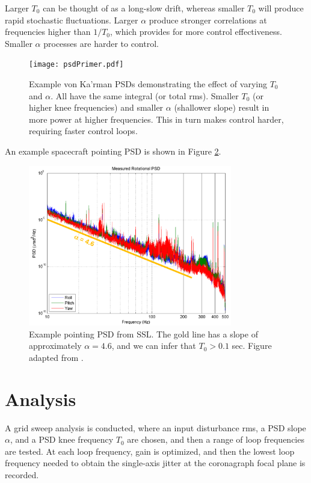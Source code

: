\documentclass[10pt,preprint]{aastex631}
\begin{document}
Larger $T_0$ can be thought of as a long-slow drift, whereas smaller $T_0$ will produce rapid stochastic fluctuations.  Larger $\alpha$ produce stronger correlations at frequencies higher than $1/T_0$, which provides for more control effectiveness.  Smaller $\alpha$ processes are harder to control.

\begin{figure}
\centering
\texttt{[image: psdPrimer.pdf]}
\caption{Example von Ka'rman PSDs demonstrating the effect of varying $T_0$ and $\alpha$.  All have the same integral (or total rms). Smaller $T_0$ (or higher knee frequencies) and smaller $\alpha$ (shallower slope) result in more power at higher frequencies.  This in turn makes control harder, requiring faster control loops. \label{fig:vkpsds}}
\end{figure}

An example spacecraft pointing PSD is shown in Figure \ref{fig:examp_psd}.

\begin{figure}
\centering
\includegraphics[width=3.5in]{ssl_example.png}
\caption{Example pointing PSD from SSL.  The gold line has a slope of approximately $\alpha=4.6$, and we can infer that $T_0 > 0.1$ sec.  Figure adapted from \citet{woo:2017}. \label{fig:examp_psd}}
\end{figure}

\section{Analysis}

A grid sweep analysis is conducted, where an input disturbance rms, a PSD slope $\alpha$, and a PSD knee frequency $T_0$ are chosen, and then a range of loop frequencies are tested.  At each loop frequency, gain is optimized, and then the lowest loop frequency needed to obtain the single-axis jitter at the coronagraph focal plane is recorded.
\end{document}
